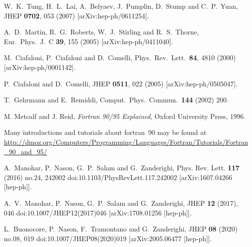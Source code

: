 \documentclass[12pt]{article}
\begin{document}
\begin{thebibliography}{99}
  W.~K.~Tung, H.~L.~Lai, A.~Belyaev, J.~Pumplin, D.~Stump and C.~P.~Yuan,
  JHEP {\bf 0702}, 053 (2007)
  [arXiv:hep-ph/0611254].

  A.~D.~Martin, R.~G.~Roberts, W.~J.~Stirling and R.~S.~Thorne,
  Eur.\ Phys.\ J.\  C {\bf 39}, 155 (2005)
  [arXiv:hep-ph/0411040].

  M.~Ciafaloni, P.~Ciafaloni and D.~Comelli,
  Phys.\ Rev.\ Lett.\  {\bf 84}, 4810 (2000)
  [arXiv:hep-ph/0001142].


  P.~Ciafaloni and D.~Comelli,
  JHEP {\bf 0511}, 022 (2005)
  [arXiv:hep-ph/0505047].


  T.~Gehrmann and E.~Remiddi,
  Comput.\ Phys.\ Commun.\  {\bf 144} (2002) 200.

  M. Metcalf and J. Reid, \emph{Fortran 90/95 Explained}, Oxford
  University Press, 1996.

 Many introductions and tutorials about
  fortran~90 may be found at
  \url{http://dmoz.org/Computers/Programming/Languages/Fortran/Tutorials/Fortran_90_and_95/}

  
A.~Manohar, P.~Nason, G.~P.~Salam and G.~Zanderighi,
Phys. Rev. Lett. \textbf{117} (2016) no.24, 242002
doi:10.1103/PhysRevLett.117.242002
[arXiv:1607.04266 [hep-ph]].

A.~V.~Manohar, P.~Nason, G.~P.~Salam and G.~Zanderighi,
JHEP \textbf{12} (2017), 046
doi:10.1007/JHEP12(2017)046
[arXiv:1708.01256 [hep-ph]].

L.~Buonocore, P.~Nason, F.~Tramontano and G.~Zanderighi,
JHEP \textbf{08} (2020) no.08, 019
doi:10.1007/JHEP08(2020)019
[arXiv:2005.06477 [hep-ph]].


\end{thebibliography}
\end{document}
